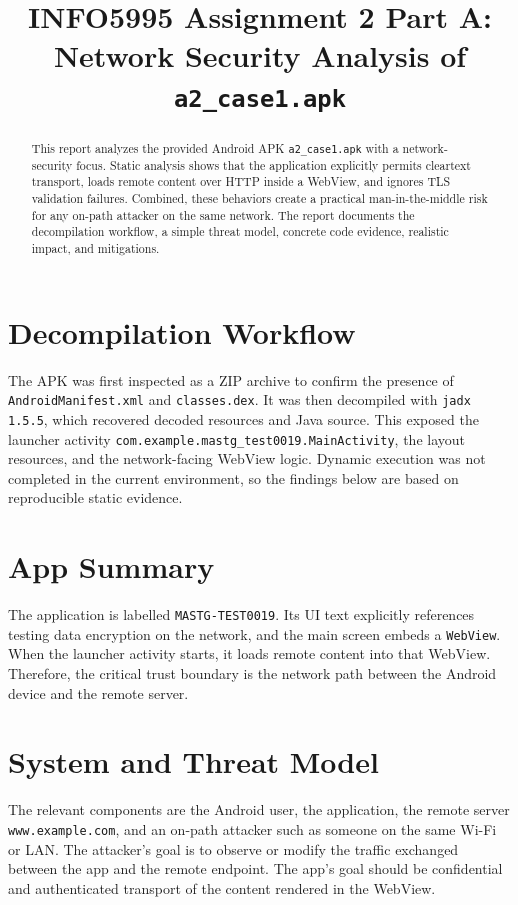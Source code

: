 \documentclass[10pt,twocolumn,letterpaper]{article}
\title{INFO5995 Assignment 2 Part A: Network Security Analysis of \texttt{a2\_case1.apk}}
\author{}
\date{}
\begin{document}
\maketitle
\thispagestyle{empty}

\begin{abstract}
This report analyzes the provided Android APK \texttt{a2\_case1.apk} with a network-security focus. Static analysis shows that the application explicitly permits cleartext transport, loads remote content over HTTP inside a WebView, and ignores TLS validation failures. Combined, these behaviors create a practical man-in-the-middle risk for any on-path attacker on the same network. The report documents the decompilation workflow, a simple threat model, concrete code evidence, realistic impact, and mitigations.
\end{abstract}

\section{Decompilation Workflow}
The APK was first inspected as a ZIP archive to confirm the presence of \texttt{AndroidManifest.xml} and \texttt{classes.dex}. It was then decompiled with \texttt{jadx 1.5.5}, which recovered decoded resources and Java source. This exposed the launcher activity \texttt{com.example.mastg\_test0019.MainActivity}, the layout resources, and the network-facing WebView logic. Dynamic execution was not completed in the current environment, so the findings below are based on reproducible static evidence.

\section{App Summary}
The application is labelled \texttt{MASTG-TEST0019}. Its UI text explicitly references testing data encryption on the network, and the main screen embeds a \texttt{WebView}. When the launcher activity starts, it loads remote content into that WebView. Therefore, the critical trust boundary is the network path between the Android device and the remote server.

\section{System and Threat Model}
The relevant components are the Android user, the application, the remote server \texttt{www.example.com}, and an on-path attacker such as someone on the same Wi-Fi or LAN. The attacker's goal is to observe or modify the traffic exchanged between the app and the remote endpoint. The app's goal should be confidential and authenticated transport of the content rendered in the WebView.
\end{document}
